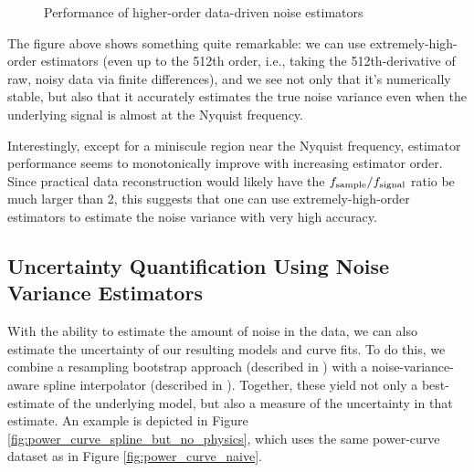 \begin{figure}[!htb]
    \centering
    \caption{Performance of higher-order data-driven noise estimators}
    \label{fig:noise_variance_higher_order}
\end{figure}


The figure above shows something quite remarkable: we can use extremely-high-order estimators (even up to the 512th order, i.e., taking the 512th-derivative of raw, noisy data via finite differences), and we see not only that it's numerically stable, but also that it accurately estimates the true noise variance even when the underlying signal is almost at the Nyquist frequency.

Interestingly, except for a miniscule region near the Nyquist frequency, estimator performance seems to monotonically improve with increasing estimator order. Since practical data reconstruction would likely have the $f_{\rm sample} / f_{\rm signal}$ ratio be much larger than 2, this suggests that one can use extremely-high-order estimators to estimate the noise variance with very high accuracy.

\subsection{Uncertainty Quantification Using Noise Variance Estimators}

With the ability to estimate the amount of noise in the data, we can also estimate the uncertainty of our resulting models and curve fits. To do this, we combine a resampling bootstrap approach (described in \cite{surrogates, elements_of_statistical_learning}) with a noise-variance-aware spline interpolator (described in \cite{surrogates, wahba}). Together, these yield not only a best-estimate of the underlying model, but also a measure of the uncertainty in that estimate. An example is depicted in Figure \ref{fig:power_curve_spline_but_no_physics}, which uses the same power-curve dataset as in Figure \ref{fig:power_curve_naive}.

